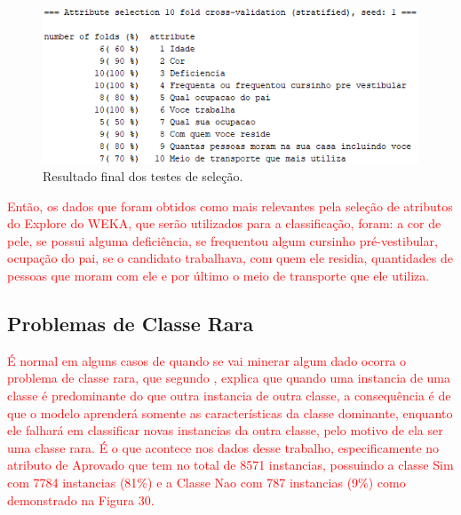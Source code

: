 \par
\begin{figure}[!htp]
	\begin{center}
    \caption{\label{fig:waveform_fig} Resultado final dos testes de seleção.}
	\includegraphics[scale=0.99]{Figuras/10_atributos.png}
	\end{center}
\end{figure}

\par
\textcolor{red}{Então, os dados que foram obtidos como mais relevantes pela seleção de atributos do Explore do WEKA, que serão utilizados para a classificação, foram: a cor de pele, se possui alguma deficiência, se frequentou algum cursinho pré-vestibular, ocupação do pai, se o candidato trabalhava, com quem ele residia, quantidades de pessoas que moram com ele e por último o meio de transporte que ele utiliza.}

\subsection{Problemas de Classe Rara}

\par
\textcolor{red}{É normal em alguns casos de quando se vai minerar algum dado ocorra o problema de classe rara, que segundo , explica que quando uma instancia de uma classe é predominante do que outra instancia de outra classe, a consequência é de que o modelo aprenderá somente as características da classe dominante, enquanto ele falhará em classificar novas instancias da outra classe, pelo motivo de ela ser uma classe rara. É o que acontece nos dados desse trabalho, especificamente no atributo de Aprovado que tem no total de 8571 instancias, possuindo a classe Sim com 7784 instancias (81\%) e a Classe Nao com 787 instancias (9\%) como demonstrado na Figura 30.}

